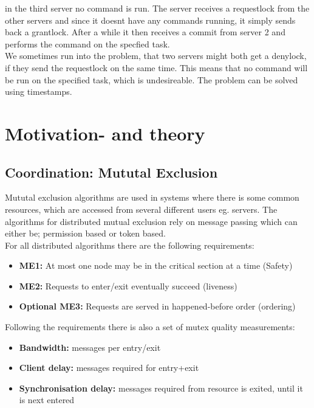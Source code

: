 in the third server no command is run. The server receives a requestlock from the other servers and since it doesnt have any commands running, it simply sends back a grantlock. After a while it then receives a commit from server 2 and performs the command on the specfied task. \\

We sometimes run into the problem, that two servers might both get a denylock, if they send the requestlock on the same time. This means that no command will be run on the specified task, which is undesireable. The problem can be solved using timestamps.

\section{Motivation- and theory}
\label{MutualExclusion_motivation}

\subsection{Coordination: Mututal Exclusion}
Mututal exclusion algorithms are used in systems where there is some common resources, which are accessed from several different users eg. servers. The algorithms for distributed mutual exclusion rely on message passing which can either be; permission based or token based. \\

For all distributed algorithms there are the following requirements:
\begin{itemize}
\item \textbf{ME1:} At most one node may be in the critical section at a time (Safety)
\item \textbf{ME2:} Requests to enter/exit eventually succeed 
(liveness)
\item \textbf{Optional ME3:} Requests are served in happened-before 
order (ordering)
\end{itemize} 

Following the requirements there is also a set of mutex quality measurements:
\begin{itemize}
\item \textbf{Bandwidth:} messages per entry/exit
\item \textbf{Client delay:} messages required for entry+exit
\item \textbf{Synchronisation delay:} messages required from resource is exited, until it is next entered
\end{itemize}

